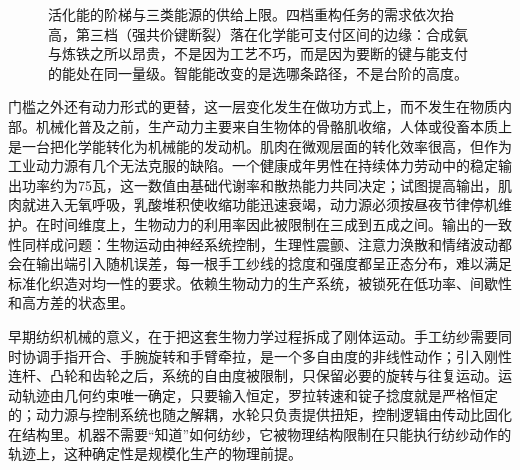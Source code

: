 \begin{figure}[ht]


\caption{活化能的阶梯与三类能源的供给上限。四档重构任务的需求依次抬高，第三档（强共价键断裂）落在化学能可支付区间的边缘：合成氨与炼铁之所以昂贵，不是因为工艺不巧，而是因为要断的键与能支付的能处在同一量级。智能能改变的是选哪条路径，不是台阶的高度。}
\label{fig:activation-ladder}
\end{figure}



门槛之外还有动力形式的更替，这一层变化发生在做功方式上，而不发生在物质内部。机械化普及之前，生产动力主要来自生物体的骨骼肌收缩，人体或役畜本质上是一台把化学能转化为机械能的发动机。肌肉在微观层面的转化效率很高，但作为工业动力源有几个无法克服的缺陷。一个健康成年男性在持续体力劳动中的稳定输出功率约为75瓦，这一数值由基础代谢率和散热能力共同决定；试图提高输出，肌肉就进入无氧呼吸，乳酸堆积使收缩功能迅速衰竭，动力源必须按昼夜节律停机维护。在时间维度上，生物动力的利用率因此被限制在三成到五成之间。输出的一致性同样成问题：生物运动由神经系统控制，生理性震颤、注意力涣散和情绪波动都会在输出端引入随机误差，每一根手工纱线的捻度和强度都呈正态分布，难以满足标准化织造对均一性的要求。依赖生物动力的生产系统，被锁死在低功率、间歇性和高方差的状态里。

早期纺织机械的意义，在于把这套生物力学过程拆成了刚体运动。手工纺纱需要同时协调手指开合、手腕旋转和手臂牵拉，是一个多自由度的非线性动作；引入刚性连杆、凸轮和齿轮之后，系统的自由度被限制，只保留必要的旋转与往复运动。运动轨迹由几何约束唯一确定，只要输入恒定，罗拉转速和锭子捻度就是严格恒定的；动力源与控制系统也随之解耦，水轮只负责提供扭矩，控制逻辑由传动比固化在结构里。机器不需要“知道”如何纺纱，它被物理结构限制在只能执行纺纱动作的轨迹上，这种确定性是规模化生产的物理前提。

